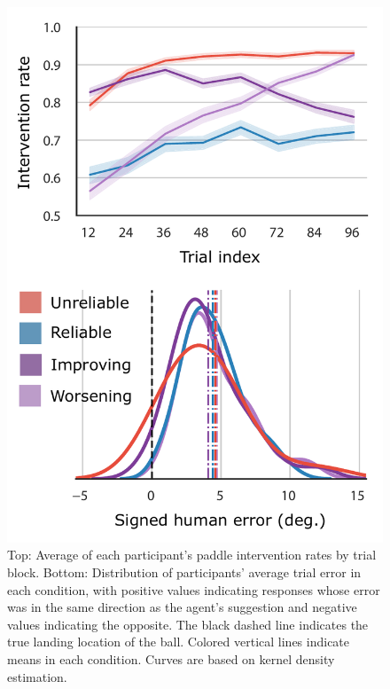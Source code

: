\documentclass[10pt,letterpaper]{article}
\begin{document}


\begin{figure}[t]
\begin{center}
\includegraphics[width=0.9\linewidth]{img/error_interventions_combined.pdf}
\end{center}
\caption{
Top: Average of each participant's paddle intervention rates by trial block. 
Bottom: Distribution of participants' average trial error in each condition, with positive values indicating responses whose error was in the same direction as the agent's suggestion and negative values indicating the opposite. The black dashed line indicates the true landing location of the ball. Colored vertical lines indicate means in each condition. Curves are based on kernel density estimation.}
\label{fig:interventions}
\end{figure}
\end{document}

